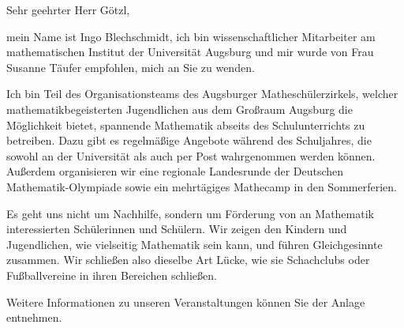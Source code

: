 \documentclass{zirkelbrief}
\begin{document}
\renewcommand{\anschrift}{%
      Dieter Götzl (Ref. V.7) \\
      Bayerisches Staatsministerium für \\
Bildung und Kultus, Wissenschaft und Kunst \\
      80327 München}
\renewcommand{\datum}{\today}
\renewcommand{\betreff}{Matheschülerzirkel der Universität Augsburg}
\renewcommand{\absender}{%
      \textbf{Ingo Blechschmidt} \\
      \ \\
      Matheschülerzirkel \\
      Institut für Mathematik \\
      Universitätsstr. 14 \\
      86159 Augsburg \\
      \ \\
      Telefon \> +49 (0) 821 598 -- 5601 \\
      Telefax \> +49 (0) 821 598 -- 2090 \\
      \textsf{blechschmidt@math.uni-augsburg.de} \\}

\makeletterhead

Sehr geehrter Herr Götzl,

mein Name ist Ingo Blechschmidt, ich bin wissenschaftlicher Mitarbeiter
am mathematischen Institut der Universität Augsburg und mir wurde von Frau Susanne Täufer empfohlen, mich an Sie zu wenden.

Ich bin Teil des Organisationsteams des Augsburger Matheschülerzirkels, welcher mathematikbegeisterten Jugendlichen aus dem Großraum Augsburg die Möglichkeit bietet, spannende Mathematik abseits des Schulunterrichts zu betreiben. Dazu gibt es regelmäßige Angebote während des Schuljahres, die sowohl an der Universität als auch per Post wahrgenommen werden können. Außerdem organisieren wir eine regionale Landesrunde der Deutschen Mathematik-Olympiade sowie ein mehrtägiges Mathecamp in den Sommerferien.

Es geht uns nicht um Nachhilfe, sondern um Förderung von an Mathematik
interessierten Schülerinnen und Schülern. Wir zeigen den Kindern und
Jugendlichen, wie vielseitig Mathematik sein kann, und führen
Gleichgesinnte zusammen. Wir schließen also dieselbe Art Lücke, wie sie
Schachclubs oder Fußballvereine in ihren Bereichen schließen.

Weitere Informationen zu unseren Veranstaltungen können Sie der Anlage entnehmen.
\end{document}
